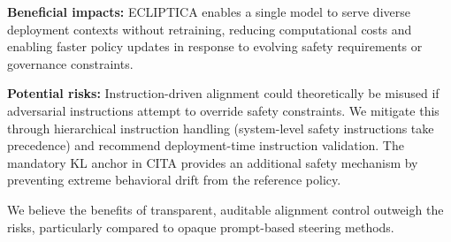 \documentclass{article}
\begin{document}
\textbf{Beneficial impacts:} ECLIPTICA enables a single model to serve diverse deployment contexts without retraining, reducing computational costs and enabling faster policy updates in response to evolving safety requirements or governance constraints.

\textbf{Potential risks:} Instruction-driven alignment could theoretically be misused if adversarial instructions attempt to override safety constraints. We mitigate this through hierarchical instruction handling (system-level safety instructions take precedence) and recommend deployment-time instruction validation. The mandatory KL anchor in CITA provides an additional safety mechanism by preventing extreme behavioral drift from the reference policy.

We believe the benefits of transparent, auditable alignment control outweigh the risks, particularly compared to opaque prompt-based steering methods.

\clearpage
\newpage



\clearpage
\newpage
\appendix
\onecolumn


%
%
\end{document}
